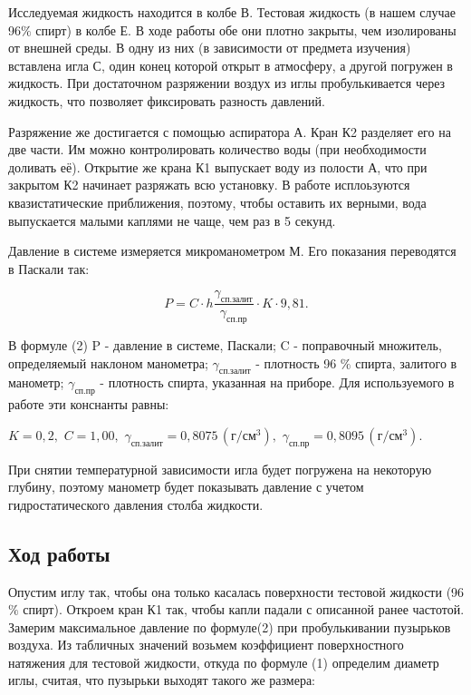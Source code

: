 \documentclass[a4paper, fontsize = 14pt]{article}
\begin{document}
Исследуемая жидкость находится в колбе В. Тестовая жидкость (в нашем случае 96$\%$ спирт) в колбе Е. В ходе работы обе они плотно закрыты, чем изолированы от внешней среды. В одну из них (в зависимости от предмета изучения) вставлена игла С, один конец которой открыт в атмосферу, а другой погружен в жидкость. При достаточном разряжении воздух из иглы пробулькивается через жидкость, что позволяет фиксировать разность давлений.

Разряжение же достигается с помощью аспиратора А. Кран К2 разделяет его на две части. Им можно контролировать количество воды (при необходимости доливать её). Открытие же крана К1 выпускает воду из полости А, что при закрытом К2 начинает разряжать всю установку. В работе исплоьзуются квазистатические приближения, поэтому, чтобы оставить их верными, вода выпускается малыми каплями не чаще, чем раз в 5 секунд. 

Давление в системе измеряется микроманометром М. Его показания переводятся в Паскали так:

\begin{equation}
	P = C \cdot h \frac{\gamma_{сп.залит}}{\gamma_{сп.пр}} \cdot K \cdot 9,81.
\end{equation}

В формуле (2) P - давление в системе, Паскали; C - поправочный множитель, определяемый наклоном манометра; $\gamma_{сп.залит}$ - плотность 96 $\%$ спирта, залитого в манометр; $\gamma_{сп.пр}$ - плотность спирта, указанная на приборе. Для используемого в работе эти конснанты равны:

$ K = 0,2 , \,\, C = 1,00, \,\, \gamma_{сп.залит} = 0,8075 \, (г/см^3) , \, \, \gamma_{сп.пр} = 0,8095 \, (г/см^3). $

При снятии температурной зависимости игла будет погружена на некоторую глубину, поэтому манометр будет показывать давление с учетом гидростатического давления столба жидкости. 

\subsection*{Ход работы}

Опустим иглу так, чтобы она только касалась поверхности тестовой жидкости (96$\%$ спирт). Откроем кран К1 так, чтобы капли падали с описанной ранее частотой. Замерим максимальное давление по формуле(2) при пробулькивании пузырьков воздуха. Из табличных значений возьмем коэффициент поверхностного натяжения для тестовой жидкости, откуда по формуле (1) определим диаметр иглы, считая, что пузырьки выходят такого же размера:
\end{document}
